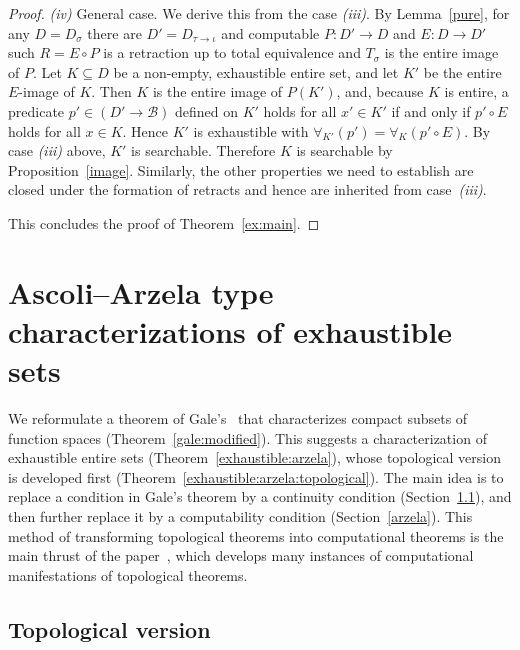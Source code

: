 \documentclass{LMCS}
\newcommand{\pBool}{\mathcal{B}}
\newcommand{\comp}{\circ}
\begin{document}
\begin{proof}
\pagebreak[3] \emph{(iv)} General case. We derive this from the case
\emph{(iii)}. By Lemma~\ref{pure}, for any $D=D_{\sigma}$ there are
$D'=D_{\tau \to \iota}$ and computable $P \colon D' \to D$ and $E
\colon D \to D'$ such $R = E \comp P$ is a retraction up to total
equivalence and $T_{\sigma}$ is the entire image of $P$.  Let $K
\subseteq D$ be a non-empty, exhaustible entire set, and let $K'$ be
the entire $E$-image of $K$. Then $K$ is the entire image of $P(K')$,
and, because $K$ is entire, a predicate $p' \in (D' \to \pBool)$
defined on $K'$ holds for all $x' \in K'$ if and only if $p' \comp E$
holds for all $x \in K$.  Hence $K'$ is exhaustible with
$\forall_{K'}(p')=\forall_K(p'\comp E)$. By case \emph{(iii)} above,
$K'$ is searchable. Therefore $K$ is searchable by
Proposition~\ref{image}. Similarly, the other properties we need to
establish are closed under the formation of retracts and hence are
inherited from case~\emph{(iii)}.  

\medskip This concludes the proof of Theorem~\ref{ex:main}.
\end{proof}



\section{Ascoli--Arzela type characterizations of exhaustible sets} \label{arzela:ascoli}


We reformulate a theorem of Gale's~\cite{gale} that characterizes
compact subsets of function spaces (Theorem~\ref{gale:modified}).
This suggests a characterization of exhaustible entire sets
(Theorem~\ref{exhaustible:arzela}), whose topological version is
developed first (Theorem~\ref{exhaustible:arzela:topological}).  The
main idea is to replace a condition in Gale's theorem by a continuity
condition (Section~\ref{arzela:compact}), and then further replace it
by a computability condition (Section~\ref{arzela}). This method of
transforming topological theorems into computational theorems is the
main thrust of the paper~\cite{escardo:barbados}, which develops many
instances of computational manifestations of topological theorems.

\subsection{Topological version}
\label{arzela:compact}
\end{document}
